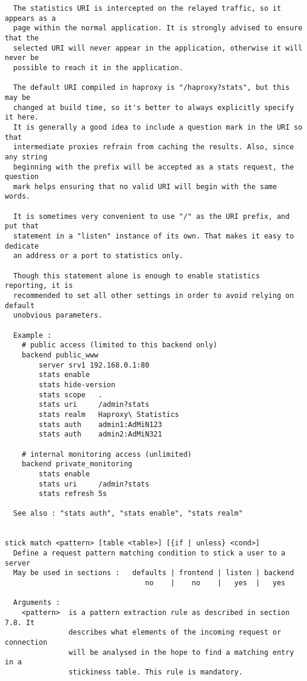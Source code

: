 \begin{verbatim}
  The statistics URI is intercepted on the relayed traffic, so it appears as a
  page within the normal application. It is strongly advised to ensure that the
  selected URI will never appear in the application, otherwise it will never be
  possible to reach it in the application.

  The default URI compiled in haproxy is "/haproxy?stats", but this may be
  changed at build time, so it's better to always explicitly specify it here.
  It is generally a good idea to include a question mark in the URI so that
  intermediate proxies refrain from caching the results. Also, since any string
  beginning with the prefix will be accepted as a stats request, the question
  mark helps ensuring that no valid URI will begin with the same words.

  It is sometimes very convenient to use "/" as the URI prefix, and put that
  statement in a "listen" instance of its own. That makes it easy to dedicate
  an address or a port to statistics only.

  Though this statement alone is enough to enable statistics reporting, it is
  recommended to set all other settings in order to avoid relying on default
  unobvious parameters.

  Example :
    # public access (limited to this backend only)
    backend public_www
        server srv1 192.168.0.1:80
        stats enable
        stats hide-version
        stats scope   .
        stats uri     /admin?stats
        stats realm   Haproxy\ Statistics
        stats auth    admin1:AdMiN123
        stats auth    admin2:AdMiN321

    # internal monitoring access (unlimited)
    backend private_monitoring
        stats enable
        stats uri     /admin?stats
        stats refresh 5s

  See also : "stats auth", "stats enable", "stats realm"


stick match <pattern> [table <table>] [{if | unless} <cond>]
  Define a request pattern matching condition to stick a user to a server
  May be used in sections :   defaults | frontend | listen | backend
                                 no    |    no    |   yes  |   yes

  Arguments :
    <pattern>  is a pattern extraction rule as described in section 7.8. It
               describes what elements of the incoming request or connection
               will be analysed in the hope to find a matching entry in a
               stickiness table. This rule is mandatory.


\end{verbatim}

